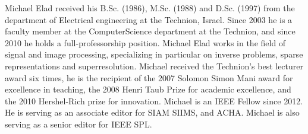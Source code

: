 \documentclass[journal]{IEEEtran}
\begin{document}
\vspace*{-30pt}

\begin{IEEEbiography}{Michael Elad}
received his B.Sc. (1986), M.Sc.
(1988) and D.Sc. (1997) from the department of
Electrical engineering at the Technion, Israel. Since
2003 he is a faculty member at the ComputerScience
department at the Technion, and since 2010
he holds a full-professorship position.
Michael Elad works in the field of signal and
image processing, specializing in particular on inverse
problems, sparse representations and superresolution.
Michael received the Technion’s best
lecturer award six times, he is the recipient of the
2007 Solomon Simon Mani award for excellence in teaching, the 2008 Henri
Taub Prize for academic excellence, and the 2010 Hershel-Rich prize for
innovation. Michael is an IEEE Fellow since 2012. He is serving as an
associate editor for SIAM SIIMS, and ACHA. Michael is also serving as
a senior editor for IEEE SPL.
\end{IEEEbiography}

\vfill
\vfill
\vfill
\vfill
\vfill
\vfill
\vfill
\vfill
\end{document}
